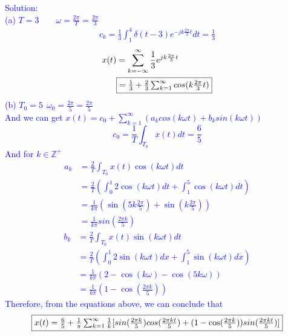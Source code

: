 \documentclass[12pt,a4paper]{article}
\begin{document}
\begin{tcolorbox}
\normalsize
\textcolor{blue}{Solution:\\
(a) $T=3\qquad \omega=\frac{2\pi}{T}=\frac{2\pi}{3}$ \\
\begin{equation*}
    \begin{aligned}
        c_k=\frac{1}{3}\int_{1}^{4}\delta(t-3)e^{-jk\frac{2\pi}{3}t}dt=\frac{1}{3}
    \end{aligned}
\end{equation*}
\begin{equation*}
    \begin{aligned}
        x(t)&=\sum_{k=-\infty}^\infty\frac{1}{3}e^{jk\frac{2\pi}{3}t}\\
        &\fbox{$=\frac{1}{3}+\frac{2}{3}\sum_{k=1}^\infty cos(k\frac{2\pi}{3}t)$}
    \end{aligned}
\end{equation*}
(b) $T_0=5~~\omega_0=\frac{2\pi}{5}=\frac{2\pi}{5}$\\
And we can get $x(t)=c_0+\sum_{k=1}^\infty (a_k cos(k\omega t)+b_k sin(k\omega t))$\\
$$
c_{0}=\frac{1}{T} \int_{T_{0}} x(t) d t=\frac{6}{5}
$$
And for $k \in \mathbb{Z}^{+}$
$$
\begin{aligned}
a_{k} &=\frac{2}{T} \int_{T_{0}} x(t) \cos (k \omega t) d t \\
&=\frac{2}{T}\left(\int_{0}^{1} 2 \cos (k \omega t) d t+\int_{1}^{5} \cos (k \omega t) d t\right) \\
&=\frac{1}{k \pi}(\sin (5 k \frac{2\pi}{5})+\sin (k \frac{2\pi}{5})) \\
&=\frac{1}{k \pi} sin(\frac{2\pi k}{5})
\end{aligned}
$$
$$
\begin{aligned}
b_{k} &=\frac{2}{T} \int_{T_{0}} x(t) \sin (k \omega t) d t \\
&=\frac{2}{T}\left(\int_{0}^{1} 2 \sin (k \omega t) d x+\int_{1}^{5} \sin (k \omega t) d x\right) \\
&=\frac{1}{k \pi}(2-\cos (k \omega)-\cos (5 k \omega)) \\
&=\frac{1}{k \pi}(1-\cos(\frac{2 \pi k}{5}))
\end{aligned}
$$
Therefore, from the equations above, we can conclude that
$$\fbox{$
x(t)=\frac{6}{5}+\frac{1}{\pi} \sum_{k=1}^{\infty}\frac{1}{k}[sin(\frac{2\pi k}{5}) cos(\frac {2\pi kt}{5})+(1-\cos(\frac {2 \pi k}{5}))sin(\frac{2\pi kt}{5})]
$}$$
}
\end{tcolorbox}
\end{document}
